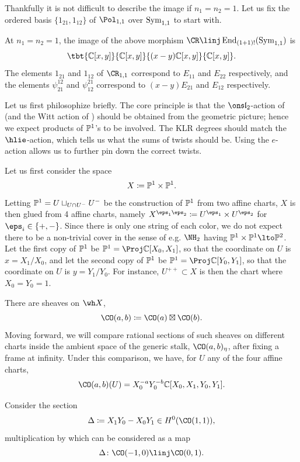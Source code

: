\documentclass[11pt,reqno]{amsart}
\begin{document}
Thankfully it is not difficult to describe the image if $n_1=n_2=1$. Let us fix the ordered basis $\{1_{21},1_{12}\}$ of $\Pol_{1,1}$ over $\operatorname{Sym}_{1,1}$ to start with.
\begin{lemma}
    At $n_1=n_2=1$, the image of the above morphism $\CR\linj \End_{(1+1)!}(\Sym_{1,1})$ is 
    \[\tbt{\BC[x,y]}{\BC[x,y]}{(x-y)\BC[x,y]}{\BC[x,y]}.\]
    The elements $1_{21}$ and $1_{12}$ of $\CR_{1,1}$ correspond to $E_{11}$ and $E_{22}$ respectively, and the elements $\psi_{21}^{12}$ and $\psi_{12}^{21}$ correspond to $(x-y)E_{21}$ and $E_{12}$ respectively. 
\end{lemma}

Let us first philosophize briefly. The core principle is that the $\sl_2$-action of \cite{EQ23} (and the Witt action of \cite{lauda2025action}) should be obtained from the geometric picture; hence we expect products of $\mathbb P^1$'s to be involved. The KLR degrees should match the $\hlie$-action, which tells us what the sums of twists should be. Using the $e$-action allows us to further pin down the correct twists.

Let us first consider the space 
\[X\coloneqq \mathbb P^1\times\mathbb P^1.\] 
Letting $\mathbb P^1=U\sqcup_{U\cap U^-}U^-$ be the construction of $\mathbb P^1$ from two affine charts, $ X$ is then glued from 4 affine charts, namely $X^{\eps_1\eps_2}\coloneqq U^{\eps_1}\times U^{\eps_2}$ for $\eps_i\in\{+,-\}$. Since there is only one string of each color, we do not expect there to be a non-trivial cover in the sense of e.g. $\NH_2$ having $\BP^1\times\BP^1\lto \BP^2$. Let the first copy of $\mathbb P^1$ be $\BP^1=\Proj\BC[X_0,X_1]$, so that the coordinate on $U$ is $x=X_1/X_0$, and let the second copy of $\mathbb P^1$ be $\BP^1=\Proj\BC[Y_0,Y_1]$, so that the coordinate on $U$ is $y=Y_1/Y_0$. For instance, $U^{++}\subset X$ is then the chart where $X_0=Y_0=1$. 

There are sheaves on $\wh X$,
\[\CO(a,b)\coloneqq \CO(a)\boxtimes\CO(b).\] 
Moving forward, we will compare rational sections of such sheaves on different charts inside the ambient space of the generic stalk, $\CO(a,b)_\eta$, after fixing a frame at infinity. Under this comparison, we have, for $U$ any of the four affine charts, 
\[\CO(a,b)(U)=X_0^{-a}Y_0^{-b}\BC[X_0,X_1,Y_0,Y_1].\]

Consider the section 
\[\Delta\coloneqq  X_1Y_0-X_0Y_1\in H^0(\CO(1,1)),\]
multiplication by which can be considered as a map
\[\Delta\colon \CO(-1,0)\linj \CO(0,1).\]
\end{document}
